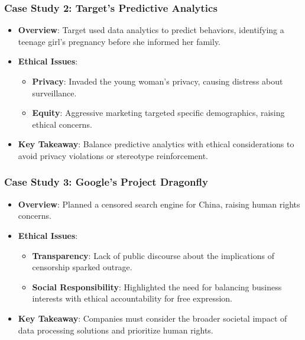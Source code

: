 \documentclass[aspectratio=169]{beamer}
\begin{document}
\begin{frame}[fragile]
    \frametitle{Case Study 2: Target's Predictive Analytics}
    \begin{itemize}
        \item \textbf{Overview}: Target used data analytics to predict behaviors, identifying a teenage girl’s pregnancy before she informed her family.
        \item \textbf{Ethical Issues}:
            \begin{itemize}
                \item \textbf{Privacy}: Invaded the young woman's privacy, causing distress about surveillance.
                \item \textbf{Equity}: Aggressive marketing targeted specific demographics, raising ethical concerns.
            \end{itemize}
        \item \textbf{Key Takeaway}: Balance predictive analytics with ethical considerations to avoid privacy violations or stereotype reinforcement.
    \end{itemize}
\end{frame}

\begin{frame}[fragile]
    \frametitle{Case Study 3: Google’s Project Dragonfly}
    \begin{itemize}
        \item \textbf{Overview}: Planned a censored search engine for China, raising human rights concerns.
        \item \textbf{Ethical Issues}:
            \begin{itemize}
                \item \textbf{Transparency}: Lack of public discourse about the implications of censorship sparked outrage.
                \item \textbf{Social Responsibility}: Highlighted the need for balancing business interests with ethical accountability for free expression.
            \end{itemize}
        \item \textbf{Key Takeaway}: Companies must consider the broader societal impact of data processing solutions and prioritize human rights.
    \end{itemize}
\end{frame}
\end{document}
